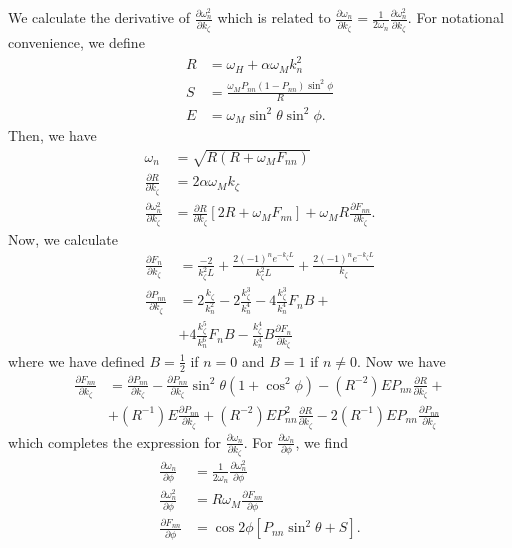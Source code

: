 \documentclass{article}
\begin{document}
We calculate the derivative of $\frac{\partial \omega_{n}^2}{\partial k_{\zeta}}$ which is related to $\frac{\partial \omega_{n}}{\partial k_{\zeta}} = \frac{1}{2 \omega_{n}} \frac{\partial \omega_{n}^2}{\partial k_{\zeta}}$. For notational convenience, we define 
\begin{align}
R &= \omega_{H} + \alpha \omega_{M} k_{n}^2 \\
S &= \frac{\omega_{M} P_{nn} (1 - P_{nn}) \sin^2{\phi}}{R} \\
E &= \omega_{M} \sin^2{\theta} \sin^2{\phi}.
\end{align}
Then, we have
\begin{align}
\omega_{n} &= \sqrt{R(R + \omega_{M} F_{nn})} \\
\frac{\partial R}{\partial k_{\zeta}} &= 2  \alpha \omega_{M} k_{\zeta} \\
\frac{\partial \omega_{n}^2}{\partial k_{\zeta}} &= \frac{\partial R}{\partial k_{\zeta}} \left[2R + \omega_{M} F_{nn} \right] + \omega_{M} R \frac{\partial F_{nn}}{\partial k_{\zeta}}.
\end{align}
Now, we calculate
\begin{align}
\frac{\partial F_{n}}{\partial k_{\zeta}} &= \frac{-2}{k_{\zeta}^2 L} + \frac{2 (-1)^n e^{-k_{\zeta} L}}{k_{\zeta}^2 L} + \frac{2 (-1)^n e^{-k_{\zeta} L}}{k_{\zeta}} \\
\frac{\partial P_{nn}}{\partial k_{\zeta}} &= 2 \frac{k_{\zeta}}{k_{n}^{2}} - 2 \frac{k_{\zeta}^3}{k_{n}^{4}} - 4 \frac{k_{\zeta}^3}{k_{n}^{4}}   F_{n} B +  \\
&+ 4 \frac{k_{\zeta}^5}{k_{n}^{6}} F_{n} B - \frac{k_{\zeta}^4}{k_{n}^{4}} B \frac{\partial F_{n}}{\partial k_{\zeta}} \nonumber
\end{align}
where we have defined $B = \frac{1}{2}$ if $n=0$ and $B=1$ if $n \neq 0$.
Now we have
\begin{align}
\frac{\partial F_{nn}}{\partial k_{\zeta}} &= \frac{\partial P_{nn}}{\partial k_{\zeta}} - \frac{\partial P_{nn}}{\partial k_{\zeta}} \sin^2{\theta} (1 + \cos^2{\phi}) - (R^{-2}) E P_{nn} \frac{\partial R}{\partial k_{\zeta}} + \\
&+ (R^{-1}) E \frac{\partial P_{nn}}{\partial k_{\zeta}}  + (R^{-2}) E P_{nn}^2 \frac{\partial R}{\partial k_{\zeta}} - 2 (R^{-1}) E P_{nn} \frac{\partial P_{nn}}{\partial k_{\zeta}} \nonumber
\end{align}
which completes the expression for $\frac{\partial \omega_{n}}{\partial k_{\zeta}}$. For $\frac{\partial \omega_{n}}{\partial \phi}$, we find
\begin{align}
\frac{\partial \omega_{n}}{\partial \phi} &= \frac{1}{2 \omega_{n}} \frac{\partial \omega_{n}^2}{\partial \phi} \\
\frac{\partial \omega_{n}^2}{\partial \phi} &= R \omega_{M} \frac{\partial F_{nn}}{\partial \phi} \\
\frac{\partial F_{nn}}{\partial \phi} &= \cos{2\phi} \left[ P_{nn} \sin^2{\theta} + S \right].
\end{align}
\end{document}
